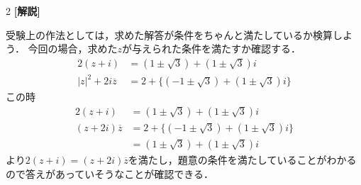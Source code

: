 \documentclass[../../main.tex]{subfiles}
\begin{document}
\begin{multicols}{2}
  {\bf [解説]}

  受験上の作法としては，求めた解答が条件をちゃんと満たしているか検算しよう．
  今回の場合，求めた$z$が与えられた条件を満たすか確認する．
  \begin{align}
    2(z+i)               & = (1 \pm \sqrt{3}) + (1 \pm \sqrt{3})i         \\
    |z|^2+2i\overline{z} & = 2 + \{(-1 \pm \sqrt{3}) + (1 \pm \sqrt{3})i\}
  \end{align}
  この時
  \begin{align}
    2(z+i)
    & = (1 \pm \sqrt{3}) + (1 \pm \sqrt{3})i         \\
    (z+2i)\overline{z}
    & = 2 + \{(-1 \pm \sqrt{3}) + (1 \pm \sqrt{3})i\} \\
    & =  (1 \pm \sqrt{3}) + (1 \pm \sqrt{3})i
  \end{align}
  より$2(z+i)=(z+2i)\overline{z}$を満たし，題意の条件を満たしていることがわかるので答えがあっていそうなことが確認できる．

  \newpage
\end{multicols}
\end{document}

